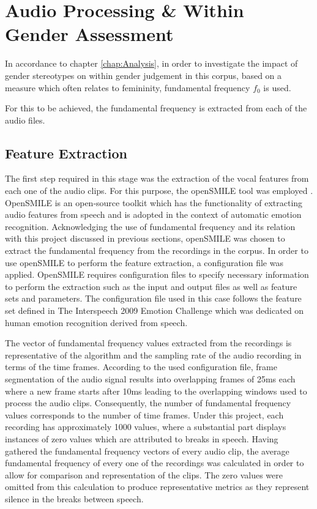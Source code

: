 \documentclass{l4proj}
\begin{document}
\section{Audio Processing  \& Within Gender Assessment}

In accordance to chapter \ref{chap:Analysis}, in order to investigate the impact of gender stereotypes on within gender judgement in this corpus, based on a measure which often relates to femininity,  fundamental frequency $f_0$ is used.

For this to be achieved, the fundamental frequency is extracted from each of the audio files.

\subsection{Feature Extraction}

The first step required in this stage was the extraction of the vocal features from each one of the audio clips. For this purpose, the openSMILE tool was employed \citep{Eyben2010}. OpenSMILE is an open-source toolkit which has the functionality of extracting audio features from speech and is adopted in the context of automatic emotion recognition. Acknowledging the use of fundamental frequency and its relation with this project discussed in previous sections, openSMILE was chosen to extract the fundamental frequency from the recordings in the corpus.
In order to use openSMILE to perform the feature extraction, a configuration file was applied. OpenSMILE requires configuration files to specify necessary information to perform the extraction such as the input and output files as well as feature sets and parameters. The configuration file used in this case follows the feature set defined in The Interspeech 2009 Emotion Challenge \citep{schuller2009interspeech} which was dedicated on human emotion recognition derived from speech.

The vector of fundamental frequency values extracted from the recordings is representative of the algorithm and the sampling rate of the audio recording in terms of the time frames. According to the used configuration file, frame segmentation of the audio signal results into overlapping frames of 25ms each where a new frame starts after 10ms leading to the overlapping windows used to process the audio clips.
Consequently, the number of fundamental frequency values corresponds to the number of time frames. Under this project, each recording has approximately 1000 values, where a substantial part displays instances of zero values which are attributed to breaks in speech.
Having gathered the fundamental frequency vectors of every audio clip, the average fundamental frequency of every one of the recordings was calculated in order to allow for comparison and representation of the clips. The zero values were omitted from this calculation to produce representative metrics as they represent silence in the breaks between speech.
\end{document}
